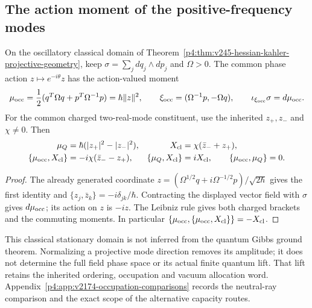\documentclass[12pt,a4paper]{article}
\begin{document}


\subsection{The action moment of the positive-frequency modes}
\begin{proposition}
\label{p4:prop:v2174-occupation-phase-moment}
On the oscillatory classical domain of
Theorem~\ref{p4:thm:v245-hessian-kahler-projective-geometry}, keep
$\sigma=\sum_jdq_j\wedge dp_j$ and $\Omega>0$. The common phase action
$z\mapsto e^{-i\theta}z$ has the action-valued moment
\begin{equation}
 \mu_{\rm occ}=\frac12(q^T\Omega q+p^T\Omega^{-1}p)
       =\hbar\|z\|^2,\qquad
 \xi_{\rm occ}=(\Omega^{-1}p,-\Omega q),\qquad
 \iota_{\xi_{\rm occ}}\sigma=d\mu_{\rm occ}.
 \label{p4:eq:v2174-occupation-moment}
\end{equation}
For the common charged two-real-mode constituent, use the inherited
$z_+,z_-$ and $\chi\ne0$. Then
\begin{align}
 \mu_Q&=\hbar(|z_+|^2-|z_-|^2),&
 X_{\rm cl}&=\chi(\bar z_-+z_+),\nonumber\\
 \{\mu_{\rm occ},X_{\rm cl}\}
     &=-i\chi(\bar z_--z_+),&
 \{\mu_Q,X_{\rm cl}\}&=iX_{\rm cl},\qquad
 \{\mu_{\rm occ},\mu_Q\}=0.
 \label{p4:eq:v2174-charged-phase-brackets}
\end{align}
\end{proposition}
\begin{proof}
The already generated coordinate
$z=(\Omega^{1/2}q+i\Omega^{-1/2}p)/\sqrt{2\hbar}$ gives the first
identity and $\{z_j,\bar z_k\}=-i\delta_{jk}/\hbar$.
Contracting the displayed vector field with $\sigma$ gives $d\mu_{\rm occ}$;
its action on $z$ is $-iz$. The Leibniz rule gives both charged brackets
and the commuting moments. In particular
$\{\mu_{\rm occ},\{\mu_{\rm occ},X_{\rm cl}\}\}=-X_{\rm cl}$.
\end{proof}
This classical stationary domain is not inferred from the quantum Gibbs
ground theorem. Normalizing a projective mode direction removes its
amplitude; it does not determine the full field phase space or its actual
finite quantum lift. That lift retains the inherited ordering, occupation
and vacuum allocation word. Appendix~\ref{p4:app:v2174-occupation-comparisons}
records the neutral-ray comparison and the exact scope of the alternative
capacity routes.
\end{document}
